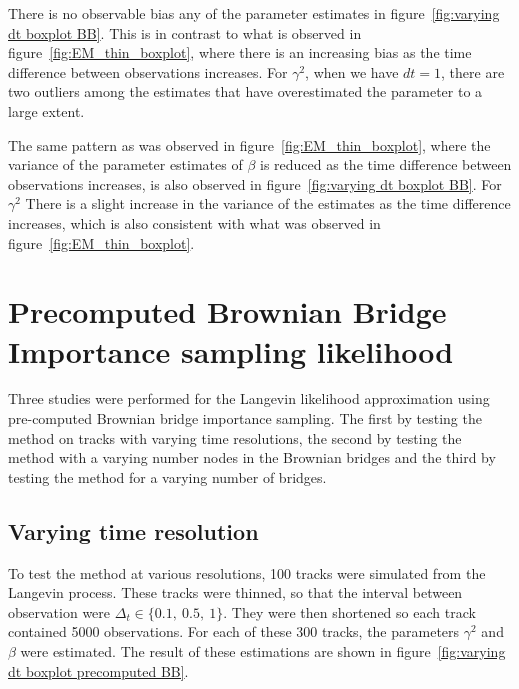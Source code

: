 There is no observable bias any of the parameter estimates in figure~\ref{fig:varying dt boxplot BB}. This is in contrast to what is observed in figure~\ref{fig:EM_thin_boxplot}, where there is an increasing bias as the time difference between observations increases. For $\gamma^2$, when we have $dt=1$, there are two outliers among the estimates that have overestimated the parameter to a large extent. 

The same pattern as was observed in figure~\ref{fig:EM_thin_boxplot}, where the variance of the parameter estimates of $\beta$ is reduced as the time difference between observations increases, is also observed in figure~\ref{fig:varying dt boxplot BB}. For $\gamma^2$ There is a slight increase in the variance of the estimates as the time difference increases, which is also consistent with what was observed in figure~\ref{fig:EM_thin_boxplot}.


\section{Precomputed Brownian Bridge Importance sampling likelihood}
Three studies were performed for the Langevin likelihood approximation using pre-computed Brownian bridge importance sampling. The first by testing the method on tracks with varying time resolutions, the second by testing the method with a varying number nodes in the Brownian bridges and the third by testing the method for a varying number of bridges.

\subsection{Varying time resolution}
To test the method at various resolutions, 100 tracks were simulated from the Langevin process. These tracks were thinned, so that the interval between observation were $\Delta_t \in \{0.1, \ 0.5, \ 1\}$. They were then shortened so each track contained 5000 observations. For each of these 300 tracks, the parameters $\gamma^2$ and $\beta$ were estimated. The result of these estimations are shown in figure~\ref{fig:varying dt boxplot precomputed BB}.

